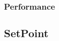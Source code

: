 \documentclass[12pt]{article}
\newcounter{TestCounter}
\begin{document}
	\subsubsection{Performance}


\subsection{SetPoint} %
\end{document}
